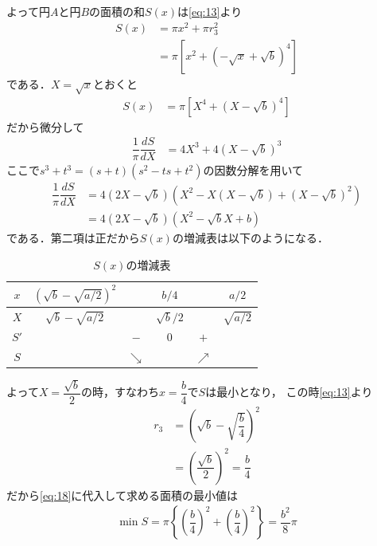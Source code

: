 \documentclass[../../main.tex]{subfiles}
\begin{document}
よって円$A$と円$B$の面積の和$S(x)$は\cref{eq:13}より
\begin{align}
  S(x)
  &= \pi x^2 + \pi r_3^2 \\
  &= \pi \left[x^2 + \left(-\sqrt{x} + \sqrt{b}\right)^4 \right] \label{eq:18}
\end{align}
である．$X=\sqrt{x}$とおくと
\begin{align}
  S(x)
  &= \pi\left[X^4 + \left(X - \sqrt{b}\right)^4 \right]
\end{align}
だから微分して
\begin{align}
  \dfrac{1}{\pi}\dfrac{dS}{dX}
  &= 4X^3 + 4\left(X-\sqrt{b}\right)^3
\end{align}
ここで$s^3+t^3 = (s+t)(s^2-ts+t^2)$の因数分解を用いて
\begin{align}
  \dfrac{1}{\pi}\dfrac{dS}{dX}
  &= 4\left(2X-\sqrt{b}\right)\left(X^2-X(X-\sqrt{b})+(X-\sqrt{b})^2\right) \\
  &= 4\left(2X-\sqrt{b}\right)\left(X^2-\sqrt{b}X+b\right)
\end{align}
である．第二項は正だから$S(x)$の増減表は以下のようになる．

\begin{table}[htb]
  \centering
  \caption{$S(x)$の増減表}
  \begin{tabular}{c|ccccc}
    $x$ & $\left(\sqrt{b}-\sqrt{a/2}\right)^2$ & & $b/4$ & & $a/2$ \\
    \hline
    $X$ & $\sqrt{b}-\sqrt{a/2}$ & & $\sqrt{b}/2$ & & $\sqrt{a/2}$ \\
    \hline
    $S'$ & & $-$ & $0$ & $+$ & \\
    \hline
    $S$ & & $\searrow$ & & $\nearrow$ &
  \end{tabular}
\end{table}

よって$X=\dfrac{\sqrt{b}}{2}$の時，すなわち$x=\dfrac{b}{4}$で$S$は最小となり，
この時\cref{eq:13}より
\begin{align}
  r_3
  &=\left(\sqrt{b}-\sqrt{\dfrac{b}{4}}\right)^2 \\
  &=\left(\dfrac{\sqrt{b}}{2}\right)^2=\dfrac{b}{4}
\end{align}
だから\cref{eq:18}に代入して求める面積の最小値は
\begin{align}
  \min S=\pi\left\{\left(\dfrac{b}{4}\right)^2+\left(\dfrac{b}{4}\right)^2\right\}=\dfrac{b^2}{8}\pi
\end{align}

\newpage
\end{document}
